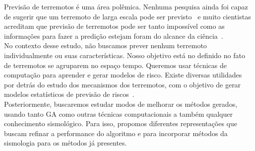 Previsão de terremotos é uma área polêmica. Nenhuma pesquisa ainda foi capaz de sugerir que um terremoto de larga escala pode ser previsto~\cite{ecta14} e muito cientistas acreditam que previsão de terremotos pode ser tanto impossível como as informações para fazer a predição estejam foram do alcance da ciência~\cite{eberhard2014multiscale}.\\

No contexto desse estudo, não buscamos prever nenhum terremoto individualmente ou suas características. Nosso objetivo está no definido no fato de terremotos se agruparem no espaço tempo. Queremos usar técnicas de computação para aprender e gerar modelos de risco. Existe diversas utilidades por detrás do estudo dos mecanismos dos terremotos, com o objetivo de gerar modelos estatísticos de previsão de riscos~\cite{Nature1999}.\\

Posteriormente, buscaremos estudar modos de melhorar os métodos gerados, usando tanto GA como outras técnicas computacionais a também qualquer conhecimento sismológico. Para isso, propomos diferentes representações que buscam refinar a performance do algoritmo e para incorporar métodos da sismologia para os métodos já presentes.\\

